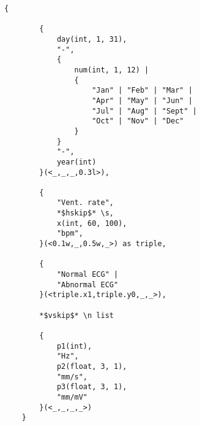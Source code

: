 \newsavebox{\absflisting}
\begin{lrbox}{\absflisting}%
\begin{lstlisting}[basicstyle=\tiny,]
    {

        {
            day(int, 1, 31),
            "-",
            {
                num(int, 1, 12) |
                {
                    "Jan" | "Feb" | "Mar" | 
                    "Apr" | "May" | "Jun" | 
                    "Jul" | "Aug" | "Sept" | 
                    "Oct" | "Nov" | "Dec"
                }
            }
            "-",
            year(int)
        }(<_,_,_,0.3l>),

        {
            "Vent. rate",
            *$hskip$* \s,
            x(int, 60, 100),
            "bpm",
        }(<0.1w,_,0.5w,_>) as triple,

        {
            "Normal ECG" | 
            "Abnormal ECG"
        }(<triple.x1,triple.y0,_,_>),

        *$vskip$* \n list
        
        {
            p1(int),
            "Hz",
            p2(float, 3, 1),
            "mm/s",
            p3(float, 3, 1),
            "mm/mV"
        }(<_,_,_,_>)
    }
\end{lstlisting}
\end{lrbox}





